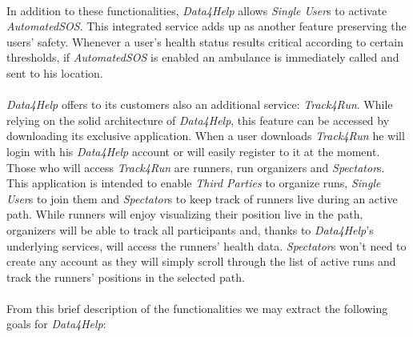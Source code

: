 \documentclass[titlepage]{article}
\begin{document}
\\
In addition to these functionalities, {\it Data4Help} allows {\it Single User}s to activate {\it AutomatedSOS}. This integrated service adds up as another feature preserving the users’ safety. Whenever a user’s health status results critical according to certain thresholds, if {\it AutomatedSOS} is enabled an ambulance is immediately called and sent to his location.\\
\\
{\it Data4Help} offers to its customers also an additional service: {\it Track4Run}. While relying on the solid architecture of {\it Data4Help}, this feature can be accessed by downloading its exclusive application. When a user downloads {\it Track4Run} he will login with his {\it Data4Help} account or will easily register to it at the moment. Those who will access {\it Track4Run} are runners, run organizers and {\it Spectator}s. This application is intended to enable {\it Third Parties} to organize runs, {\it Single User}s to join them and {\it Spectator}s to keep track of runners live during an active path. While runners will enjoy visualizing their position live in the path, organizers will be able to track all participants and, thanks to {\it Data4Help}’s underlying services, will access the runners’ health data. {\it Spectator}s won’t need to create any account as they will simply scroll through the list of active runs and track the runners’ positions in the selected path.\\
\\
From this brief description of the functionalities we may extract the following goals for {\it Data4Help}: \\
		
\end{document}
